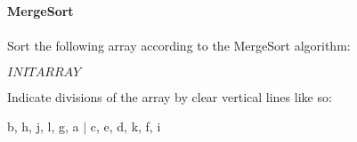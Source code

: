 \documentclass[12pt]{article}
\begin{document}
    \textbf{\LARGE{\color{tumgadRed} MergeSort}}\\
    \\
    \noindent
    Sort the following array according to the MergeSort algorithm:
    \begin{center}
        $INITARRAY$
    \end{center}
    Indicate divisions of the array by clear vertical lines like so:
    \noindent
    \begin{center}
        b, h, j, l, g, a $|$ c, e, d, k, f, i\\
        \vspace{10px}
    \end{center}
    \noindent{}
\end{document}
